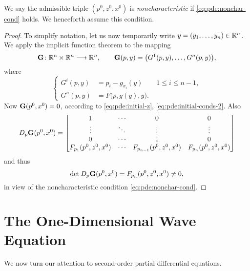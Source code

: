 We say the admissible triple \((p^0,z^0,x^0)\) is \emph{noncharacteristic}
if \eqref{eq:pde:nonchar-cond} holds. We henceforth assume this condition.
\begin{proof}
  To simplify notation, let us now temporarily write
  \(y=(y_1,\dotsc,y_n)\in\mathbb{R}^n\). We apply the implicit function theorem
  to the mapping
  \[
    \mathbf{G}\colon\mathbb{R}^n\times\mathbb{R}^n\longrightarrow\mathbb{R}^n,\qquad
    \mathbf{G}(p,y)=\bigl(G^1(p,y),\dotsc,G^n(p,y)\bigr),
  \]
  where
  \[
    \left\{
      \begin{aligned}
        G^i(p,y)&=p_i-g_{x_i}(y)\qquad 1\leq i\leq n-1,\\
        G^n(p,y)&=F\bigl(p,g(y),y\bigr).
      \end{aligned}
    \right.
  \]
  Now \(\mathbf{G}(p^0,x^0)=0\), according to \eqref{eq:pde:initial-z},
  \eqref{eq:pde:initial-conds-2}. Also
  \[
    D_p\mathbf{G}(p^0,x^0)
    =
    \begin{bmatrix}
      1&\cdots&0&0\\
      \vdots&\ddots&\vdots&\vdots\\
      0&\cdots&1&0\\
      F_{p_1}(p^0,z^0,x^0)&\cdots&F_{p_{n-1}}(p^0,z^0,x^0)&F_{p_n}(p^0,z^0,x^0)
    \end{bmatrix}
  \]
  and thus
  \[
    \det D_p\mathbf{G}(p^0,x^0)=F_{p_n}(p^0,z^0,x^0)\neq 0,
  \]
  in view of the noncharacteristic condition \eqref{eq:pde:nonchar-cond}.
\end{proof}

\section{The One-Dimensional Wave Equation}
We now turn our attention to second-order partial differential equations.

